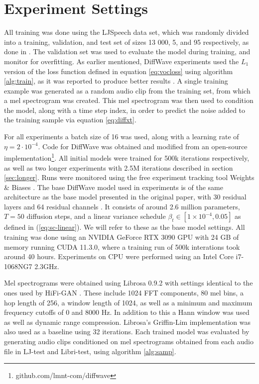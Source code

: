 \documentclass{report}
\begin{document}
\section{Experiment Settings} \label{sec:settings}
All training was done using the LJSpeech data set, which was randomly divided into a training, validation, and test set of sizes 13 000, 5, and 95 respectively, as done in \cite{lee2021priorgrad}. The validation set was used to evaluate the model during training, and monitor for overfitting. As earlier mentioned, DiffWave experiments used the $L_1$ version of the loss function defined in equation \ref{eq:vocloss} using algorithm \ref{alg:train}, as it was reported to produce better results \cite{chen2020wavegrad}. A single training example was generated as a random audio clip from the training set, from which a mel spectrogram was created. This mel spectrogram was then used to condition the model, along with a time step index, in order to predict the noise added to the training sample via equation \ref{eq:diffxt}.

For all experiments a batch size of 16 was used, along with a learning rate of $\eta = 2 \cdot 10^{-4}$. Code for DiffWave was obtained and modified from an open-source implementation\footnote{github.com/lmnt-com/diffwave}. All initial models were trained for 500k iterations respectively, as well as two longer experiments with 2.5M iterations described in section \ref{sec:longer}. Runs were monitored using the free experiment tracking tool Weights \& Biases \cite{wandb}. The base DiffWave model used in experiments is of the same architecture as the base model presented in the original paper, with 30 residual layers and 64 residual channels \cite{kong2020diffwave}. It consists of around 2.6 million parameters, $T=50$ diffusion steps, and a linear variance schedule $\beta_t \in [1 \times 10^{-4}, 0.05]$ as defined in (\ref{eq:sc-linear}). We will refer to these as the base model settings. All training was done using an NVIDIA GeForce RTX 3090 GPU with 24 GB of memory running CUDA 11.3.0, where a training run of 500k interations took around 40 hours. Experiments on CPU were performed using an Intel Core i7-1068NG7 2.3GHz.

Mel spectrograms were obtained using Librosa 0.9.2 with settings identical to the ones used by HiFi-GAN \cite{kong2020hifi}. These include 1024 FFT components, 80 mel bins, a hop length of 256, a window length of 1024, as well as a minimum and maximum frequency cutoffs of 0 and 8000 Hz. In addition to this a Hann window was used as well as dynamic range compression. Librosa's Griffin-Lim implementation was also used as a baseline using 32 iterations. Each trained model was evaluated by generating audio clips conditioned on mel spectrograms obtained from each audio file in LJ-test and Libri-test, using algorithm \ref{alg:samp}.
\end{document}
